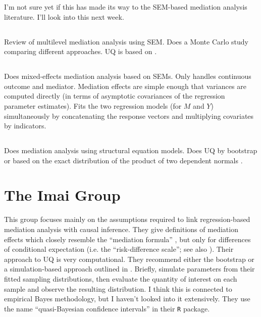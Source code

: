 \documentclass{report}
\begin{document}
I'm not sure yet if this has made its way to the SEM-based mediation analysis literature. I'll look into this next week.

\subsection{\citet{Zig19}}

Review of multilevel mediation analysis using SEM. Does a Monte Carlo study comparing different approaches. UQ is based on \citet{Bau06}.

\subsection{\citet{Bau06}}

Does mixed-effects mediation analysis based on SEMs. Only handles continuous outcome and mediator. Mediation effects are simple enough that variances are computed directly (in terms of asymptotic covariances of the regression parameter estimates). Fits the two regression models (for $M$ and $Y$) simultaneously by concatenating the response vectors and multiplying covariates by indicators.

\subsection{\citet{Pre10}}

Does mediation analysis using structural equation models. Does UQ by bootstrap or based on the exact distribution of the product of two dependent normals \citep{Mac07}.


\section{The Imai Group}
\label{sec:Imai}

This group focuses mainly on the assumptions required to link regression-based mediation analysis with causal inference. They give definitions of mediation effects which closely resemble the ``mediation formula'' \citep{Pea12}, but only for differences of conditional expectation (i.e. the ``risk-difference scale''; see also \citealp{Sam23}). Their approach to UQ is very computational. They recommend either the bootstrap or a simulation-based approach outlined in \citet{Kin00}. Briefly, simulate parameters from their fitted sampling distributions, then evaluate the quantity of interest on each sample and observe the resulting distribution. I think this is connected to empirical Bayes methodology, but I haven't looked into it extensively. They use the name ``quasi-Bayesian confidence intervals'' in their \texttt{R} package. 
\end{document}

